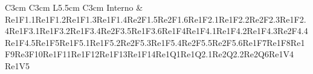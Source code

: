\begin{longtable}{C{3cm} C{3cm} L{5.5cm} C{3cm}}
Interno & Re1F1.1\newline Re1F1.2\newline Re1F1.3\newline Re1F1.4\newline Re2F1.5\newline Re2F1.6\newline  Re1F2.1\newline Re1F2.2\newline Re2F2.3\newline Re1F2.4\newline Re1F3.1\newline Re1F3.2\newline Re1F3.4\newline Re2F3.5\newline Re1F3.6\newline Re1F4\newline Re1F4.1\newline Re1F4.2\newline Re1F4.3\newline Re2F4.4\newline Re1F4.5\newline Re1F5\newline Re1F5.1\newline Re1F5.2\newline Re2F5.3\newline Re1F5.4\newline Re2F5.5\newline Re2F5.6\newline Re1F7\newline Re1F8\newline Re1F9\newline Re3F10\newline Re1F11\newline Re1F12\newline Re1F13\newline Re1F14\newline Re1Q1\newline  Re1Q2.1\newline Re2Q2.2\newline Re2Q6\newline Re1V4
\newline  Re1V5\\


\end{longtable}
